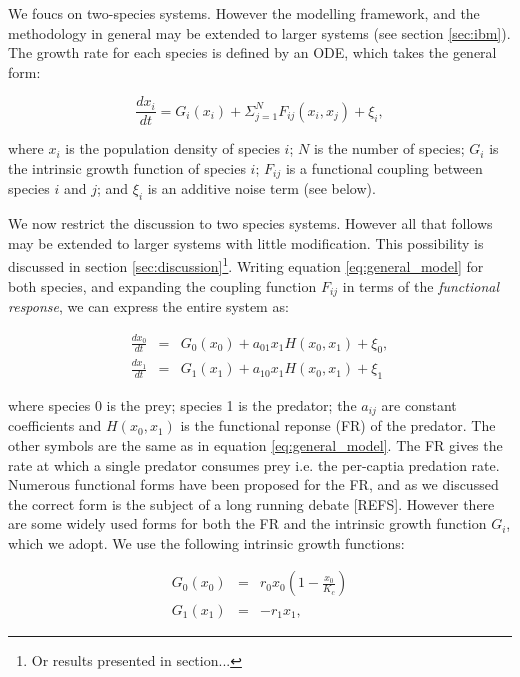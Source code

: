We foucs on two-species systems. However the modelling framework, and the methodology in general may be extended to larger systems (see section \ref{sec:ibm}). The growth rate for each species is defined by an ODE, which takes the general form:

\begin{equation}
\frac{dx_i}{dt} = G_{i}(x_i) + \Sigma_{j=1}^{N}F_{ij}(x_i,x_j) + \xi_i,
\label{eq:general_model}
\end{equation}  

where $x_i$ is the population density of species $i$; $N$ is the number of species; $G_{i}$ is the intrinsic growth function of species $i$; $F_{ij}$ is a functional coupling between species $i$ and $j$; and $\xi_i$ is an additive noise term (see below). 

We now restrict the discussion to two species systems. However all that follows may be extended to larger systems with little modification. This possibility is discussed in section \ref{sec:discussion}\footnote{Or results presented in section...}. Writing equation \ref{eq:general_model} for both species, and expanding the coupling function $F_{ij}$ in terms of the \emph{functional response}, we can express the entire system as:

\begin{eqnarray}
\frac{dx_0}{dt} &=& G_{0}(x_0) + a_{01}x_1H(x_0,x_1) + \xi_0,  \nonumber \\
\frac{dx_1}{dt} &=& G_{1}(x_1) + a_{10}x_1H(x_0,x_1) + \xi_1
\label{eq:two_species}
\end{eqnarray}

where species 0 is the prey; species 1 is the predator; the $a_{ij}$ are constant coefficients and $H(x_0,x_1)$ is the functional reponse (FR) of the predator. The other symbols are the same as in equation \ref{eq:general_model}. The FR gives the rate at which a single predator consumes prey i.e. the per-captia predation rate. Numerous functional forms have been proposed for the FR, and as we discussed the correct form is the subject of a long running debate [REFS]. However there are some widely used forms for both the FR and the intrinsic growth function $G_i$, which we adopt. We use the following intrinsic growth functions:

\begin{eqnarray}
G_0(x_0) &=& r_0x_0\left(1-\frac{x_0}{K_c}\right)  \\
G_1(x_1) &=& -r_1x_1,
\label{eq:two_species}
\end{eqnarray}

